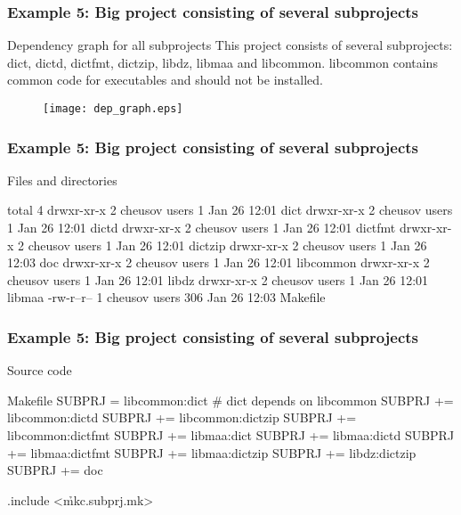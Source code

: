 \documentclass[hyperref={colorlinks=true}]{beamer}
\begin{document}
\begin{frame}[fragile]
  \frametitle{Example 5: Big project consisting of several subprojects}

  \begin{block}{Dependency graph for all subprojects}
This project consists of several subprojects: dict, dictd, dictfmt,
dictzip, libdz, libmaa and libcommon. libcommon contains common code
for executables and should not be installed.
    \begin{figure}
      \texttt{[image: dep\_graph.eps]}
    \end{figure}
  \end{block}
\end{frame}

\begin{frame}[fragile]
  \frametitle{Example 5: Big project consisting of several subprojects}

  \begin{block}{Files and directories}
    \begin{CodeNoLabel}
total 4
drwxr-xr-x 2 cheusov users   1 Jan 26 12:01 dict
drwxr-xr-x 2 cheusov users   1 Jan 26 12:01 dictd
drwxr-xr-x 2 cheusov users   1 Jan 26 12:01 dictfmt
drwxr-xr-x 2 cheusov users   1 Jan 26 12:01 dictzip
drwxr-xr-x 2 cheusov users   1 Jan 26 12:03 doc
drwxr-xr-x 2 cheusov users   1 Jan 26 12:01 libcommon
drwxr-xr-x 2 cheusov users   1 Jan 26 12:01 libdz
drwxr-xr-x 2 cheusov users   1 Jan 26 12:01 libmaa
-rw-r--r-- 1 cheusov users 306 Jan 26 12:03 \h{Makefile}
\prompt{\$}
    \end{CodeNoLabel}
  \end{block}
\end{frame}

\begin{frame}[fragile]
  \frametitle{Example 5: Big project consisting of several subprojects}

  \begin{block}{Source code}
  \begin{Code}{Makefile}
SUBPRJ =   libcommon:dict   # dict depends on libcommon
SUBPRJ +=  libcommon:dictd
SUBPRJ +=  libcommon:dictzip
SUBPRJ +=  libcommon:dictfmt
SUBPRJ +=  libmaa:dict
SUBPRJ +=  libmaa:dictd
SUBPRJ +=  libmaa:dictfmt
SUBPRJ +=  libmaa:dictzip
SUBPRJ +=  libdz:dictzip
SUBPRJ +=  doc

.include <\h{mkc.subprj.mk}>
  \end{Code}
  \end{block}
\end{frame}
\end{document}
